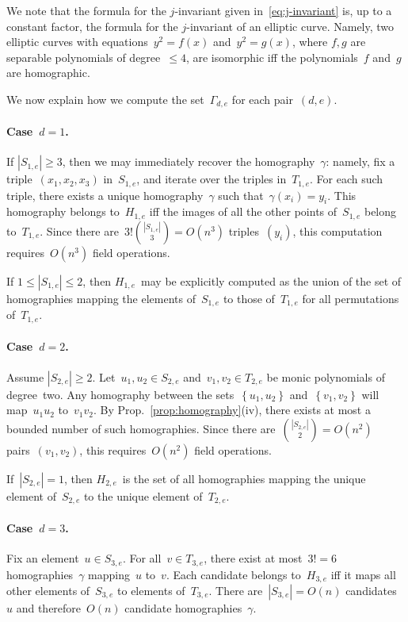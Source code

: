 \documentclass{lms}%
\def\acco#1{\left\{#1\right\}}
\def\abs#1{\left|#1\right|}
\def\card#1{\abs{#1}}
\begin{document}
We note that the formula for the $j$-invariant given
in~\eqref{eq:j-invariant} is, up to a constant factor, the formula for
the $j$-invariant of an elliptic curve. Namely, two elliptic curves with
equations~$y^2 = f(x)$ and~$y^2 = g(x)$, where $f, g$ are separable
polynomials of degree~$≤ 4$, are isomorphic iff the polynomials~$f$
and~$g$ are homographic.

\bigbreak
We now explain how we compute the set~$Γ_{d,e}$ for each pair~$(d,e)$.

\paragraph{Case~$d = 1$.}
If $\card{S_{1,e}} ≥ 3$, then we may immediately recover the
homography~$γ$: namely, fix a triple~$(x_1,x_2,x_3)$ in~$S_{1,e}$, and
iterate over the triples in~$T_{1,e}$. For each such triple, there exists
a unique homography~$γ$ such that~$γ(x_i) = y_i$. This homography belongs
to~$H_{1,e}$ iff the images of all the other points of~$S_{1,e}$ belong
to~$T_{1,e}$. Since there are~$3!\binom{\card{S_{1,e}}}{3} = O(n^3)$
triples~$(y_i)$, this computation requires~$O(n^3)$ field operations.

If $1 ≤ \card{S_{1,e}} ≤ 2$, then $H_{1,e}$~may be explicitly computed as
the union of the set of homographies mapping the elements of~$S_{1,e}$ to
those of~$T_{1,e}$ for all permutations of~$T_{1,e}$.

\paragraph{Case~$d = 2$.}
Assume $\card{S_{2,e}} ≥ 2$. Let~$u_1, u_2 ∈ S_{2,e}$ and~$v_1, v_2 ∈
T_{2,e}$ be monic polynomials of degree~two. Any homography between the
sets~$\acco{u_1, u_2}$ and~$\acco{v_1, v_2}$ will map~$u_1 u_2$ to~$v_1
v_2$. By Prop.~\ref{prop:homography}(iv), there exists at most a bounded
number of such homographies. Since there are~$\binom{\card{S_{2,e}}}{2} =
O(n^2)$ pairs~$(v_1, v_2)$, this requires~$O(n^2)$ field operations.

If~$\card{S_{2,e}} = 1$, then $H_{2,e}$~is the set of all homographies
mapping the unique element of~$S_{2,e}$ to the unique element
of~$T_{2,e}$.

\paragraph{Case~$d = 3$.}
Fix an element~$u ∈ S_{3,e}$. For all~$v ∈ T_{3,e}$, there exist at
most~$3! = 6$ homographies~$γ$ mapping~$u$ to~$v$. Each candidate belongs
to~$H_{3,e}$ iff it maps all other elements of~$S_{3,e}$ to elements
of~$T_{3,e}$. There are~$\card{S_{3,e}} = O(n)$ candidates~$u$ and
therefore~$O(n)$ candidate homographies~$γ$.
\end{document}
